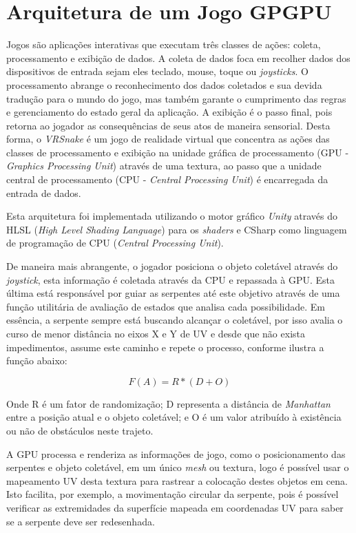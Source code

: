 \documentclass[conference]{IEEEtran}
\begin{document}
\section{Arquitetura de um Jogo GPGPU} \label{sec:architecture}
Jogos são aplicações interativas que executam três classes de ações: coleta, processamento e exibição de dados. %
A coleta de dados foca em recolher dados dos dispositivos de entrada sejam eles teclado, mouse, toque ou \textit{joysticks}. O processamento abrange o reconhecimento dos dados coletados e sua devida tradução para o mundo do jogo, mas também garante o cumprimento das regras e gerenciamento do estado geral da aplicação. A exibição é o passo final, pois retorna ao jogador as consequências de seus atos de maneira sensorial. Desta forma, o \textit{VRSnake} é um jogo de realidade virtual que concentra as ações das classes de processamento e exibição na unidade gráfica de processamento (GPU - \textit{Graphics Processing Unit}) através de uma textura, ao passo que a unidade central de processamento (CPU - \textit{Central Processing Unit}) é encarregada da entrada de dados.

Esta arquitetura foi implementada utilizando o motor gráfico \textit{Unity} através do HLSL (\textit{High Level Shading Language}) para os \textit{shaders} e CSharp como linguagem de programação de CPU (\textit{Central Processing Unit}).

De maneira mais abrangente, o jogador posiciona o objeto coletável através do \textit{joystick}, esta informação é coletada através da CPU e repassada à GPU. Esta última está responsável por guiar as serpentes até este objetivo através de uma função utilitária de avaliação de estados que analisa cada possibilidade. Em essência, a serpente sempre está buscando alcançar o coletável, por isso avalia o curso de menor distância no eixos X e Y de UV e desde que não exista impedimentos, assume este caminho e repete o processo, conforme ilustra a função abaixo:

\begin{equation}
F(A) = R * (D + O)
\label{equation11}
\end{equation}

Onde R é um fator de randomização; D representa a distância de \textit{Manhattan} entre a posição atual e o objeto coletável; e O é um valor atribuído à existência ou não de obstáculos neste trajeto.

A GPU processa e renderiza as informações de jogo, como o posicionamento das serpentes e objeto coletável, em um único \textit{mesh} ou textura, logo é possível usar o mapeamento UV desta textura para rastrear a colocação destes objetos em cena.  Isto facilita, por exemplo, a movimentação circular da serpente, pois é possível verificar as extremidades da superfície mapeada em coordenadas UV para saber se a serpente deve ser redesenhada.
\end{document}
